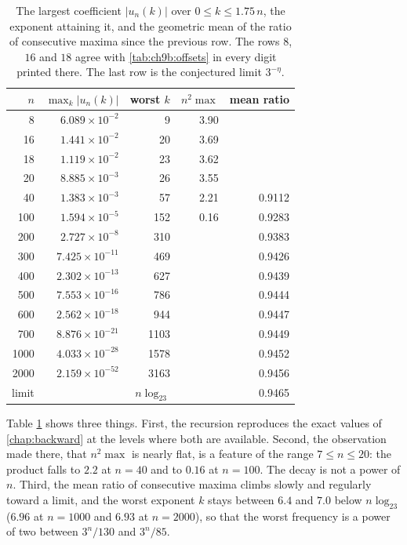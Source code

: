 \begin{table}[t]
\centering
\small
\begin{tabular}{rrrrr}
\toprule
$n$ & $\max_k|u_n(k)|$ & worst $k$ & $n^2\max$ & mean ratio\\
\midrule
8 & $6.089\times10^{-2}$ & 9 & 3.90 & \\
16 & $1.441\times10^{-2}$ & 20 & 3.69 & \\
18 & $1.119\times10^{-2}$ & 23 & 3.62 & \\
20 & $8.885\times10^{-3}$ & 26 & 3.55 & \\
40 & $1.383\times10^{-3}$ & 57 & 2.21 & 0.9112\\
100 & $1.594\times10^{-5}$ & 152 & 0.16 & 0.9283\\
200 & $2.727\times10^{-8}$ & 310 & & 0.9383\\
300 & $7.425\times10^{-11}$ & 469 & & 0.9426\\
400 & $2.302\times10^{-13}$ & 627 & & 0.9439\\
500 & $7.553\times10^{-16}$ & 786 & & 0.9444\\
600 & $2.562\times10^{-18}$ & 944 & & 0.9447\\
700 & $8.876\times10^{-21}$ & 1103 & & 0.9449\\
1000 & $4.033\times10^{-28}$ & 1578 & & 0.9452\\
2000 & $2.159\times10^{-52}$ & 3163 & & 0.9456\\
\midrule
limit & & $n\log_23$ & & 0.9465\\
\bottomrule
\end{tabular}
\caption{The largest coefficient $|u_n(k)|$ over $0\le k\le1.75\,n$, the exponent attaining it, and the geometric mean of the ratio of consecutive maxima since the previous row. The rows $8$, $16$ and $18$ agree with \cref{tab:ch9b:offsets} in every digit printed there. The last row is the conjectured limit $3^{-\eta}$.}
\label{rrt:tab:fk}
\end{table}

Table \ref{rrt:tab:fk} shows three things. First, the recursion reproduces the exact values of \cref{chap:backward} at the levels where both are available. Second, the observation made there, that $n^2\max$ is nearly flat, is a feature of the range $7\le n\le 20$: the product falls to $2.2$ at $n=40$ and to $0.16$ at $n=100$. The decay is not a power of $n$. Third, the mean ratio of consecutive maxima climbs slowly and regularly toward a limit, and the worst exponent $k$ stays between $6.4$ and $7.0$ below $n\log_23$ ($6.96$ at $n=1000$ and $6.93$ at $n=2000$), so that the worst frequency is a power of two between $3^n/130$ and $3^n/85$.


